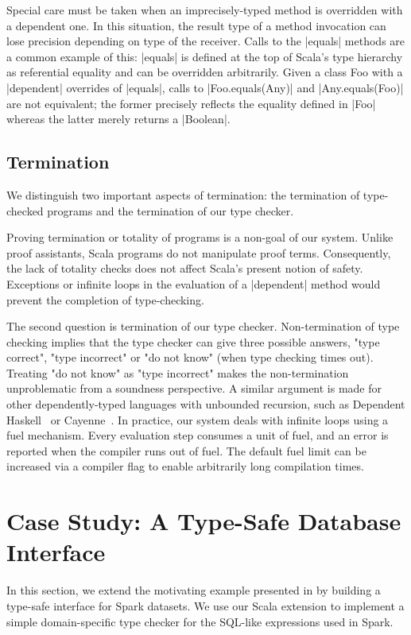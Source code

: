 Special care must be taken when an imprecisely-typed method is overridden with a dependent one.
In this situation, the result type of a method invocation can lose precision depending on type of the receiver.
Calls to the |equals| methods are a common example of this: |equals| is defined at the top of Scala's type hierarchy as referential equality and can be overridden arbitrarily.
Given a class Foo with a |dependent| overrides of |equals|, calls to |Foo.equals(Any)| and |Any.equals(Foo)| are not equivalent; the former precisely reflects the equality defined in |Foo| whereas the latter merely returns a |Boolean|.

\subsection{Termination}

We distinguish two important aspects of termination: the termination of type-checked programs and the termination of our type checker.

Proving termination or totality of programs is a non-goal of our system.
Unlike proof assistants, Scala programs do not manipulate proof terms.
Consequently, the lack of totality checks does not affect Scala's present notion of safety.
Exceptions or infinite loops in the evaluation of a |dependent| method would prevent the completion of type-checking.

The second question is termination of our type checker.
Non-termination of type checking implies that the type checker can give three possible answers, "type correct", "type incorrect" or "do not know" (when type checking times out).
Treating "do not know" as "type incorrect" makes the non-termination unproblematic from a soundness perspective.
A similar argument is made for other dependently-typed languages with unbounded recursion, such as Dependent Haskell~\citep{eisenberg2016dependent} or Cayenne~\citep{augustsson1998cayenne}.
In practice, our system deals with infinite loops using a fuel mechanism.
Every evaluation step consumes a unit of fuel, and an error is reported when the compiler runs out of fuel.
The default fuel limit can be increased via a compiler flag to enable arbitrarily long compilation times.

\section{Case Study: A Type-Safe Database Interface}
\label{sec:use-case}

In this section, we extend the motivating example presented in  by building a type-safe interface for Spark datasets.
We use our Scala extension to implement a simple domain-specific type checker for the SQL-like expressions used in Spark.

